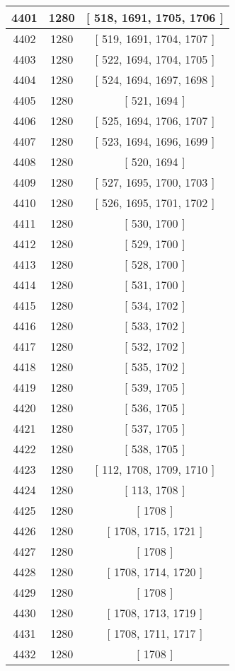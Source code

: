 \begin{center}
\begin{longtable}[H]{|| c c c ||}
\hline
4401 & 1280 & [ 518, 1691, 1705, 1706 ] \\ 
\hline
4402 & 1280 & [ 519, 1691, 1704, 1707 ] \\ 
\hline
4403 & 1280 & [ 522, 1694, 1704, 1705 ] \\ 
\hline
4404 & 1280 & [ 524, 1694, 1697, 1698 ] \\ 
\hline
4405 & 1280 & [ 521, 1694 ] \\ 
\hline
4406 & 1280 & [ 525, 1694, 1706, 1707 ] \\ 
\hline
4407 & 1280 & [ 523, 1694, 1696, 1699 ] \\ 
\hline
4408 & 1280 & [ 520, 1694 ] \\ 
\hline
4409 & 1280 & [ 527, 1695, 1700, 1703 ] \\ 
\hline
4410 & 1280 & [ 526, 1695, 1701, 1702 ] \\ 
\hline
4411 & 1280 & [ 530, 1700 ] \\ 
\hline
4412 & 1280 & [ 529, 1700 ] \\ 
\hline
4413 & 1280 & [ 528, 1700 ] \\ 
\hline
4414 & 1280 & [ 531, 1700 ] \\ 
\hline
4415 & 1280 & [ 534, 1702 ] \\ 
\hline
4416 & 1280 & [ 533, 1702 ] \\ 
\hline
4417 & 1280 & [ 532, 1702 ] \\ 
\hline
4418 & 1280 & [ 535, 1702 ] \\ 
\hline
4419 & 1280 & [ 539, 1705 ] \\ 
\hline
4420 & 1280 & [ 536, 1705 ] \\ 
\hline
4421 & 1280 & [ 537, 1705 ] \\ 
\hline
4422 & 1280 & [ 538, 1705 ] \\ 
\hline
4423 & 1280 & [ 112, 1708, 1709, 1710 ] \\ 
\hline
4424 & 1280 & [ 113, 1708 ] \\ 
\hline
4425 & 1280 & [ 1708 ] \\ 
\hline
4426 & 1280 & [ 1708, 1715, 1721 ] \\ 
\hline
4427 & 1280 & [ 1708 ] \\ 
\hline
4428 & 1280 & [ 1708, 1714, 1720 ] \\ 
\hline
4429 & 1280 & [ 1708 ] \\ 
\hline
4430 & 1280 & [ 1708, 1713, 1719 ] \\ 
\hline
4431 & 1280 & [ 1708, 1711, 1717 ] \\ 
\hline
4432 & 1280 & [ 1708 ] \\ 

\end{longtable}
\end{center}

